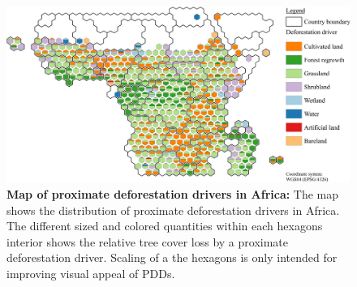 			\begin{figure}[ht]
				\centering
				\includegraphics[scale=1]{img/africa_driver_frameless}
				\caption[Map of proximate deforestion drivers in Africa]{\textbf{Map of proximate deforestation drivers in Africa:} The map shows the distribution of proximate deforestation drivers in Africa. The different sized and colored quantities within each hexagons interior shows the relative tree cover loss by a proximate deforestation driver. Scaling of a the hexagons is only intended for improving visual appeal of \acp{PDD}.}
				\label{fig:africa_driver}
			\end{figure}

